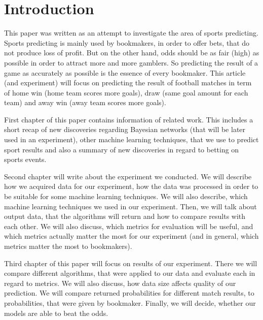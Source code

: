 \documentclass[conference]{IEEEtran}
\begin{document}




%
\IEEEpeerreviewmaketitle



\section{Introduction}

This paper was written as an attempt to investigate the area of sports predicting.
Sports predicting is mainly used by bookmakers, in order to offer bets, that do 
not produce loss of profit. But on the other hand, odds should be as fair (high) as possible
in order to attract more and more gamblers. So predicting the result of a game as accurately
as possible is the essence of every bookmaker. This article (and experiment) will focus on 
predicting the result of football matches in term of home win (home team scores more goals),
draw (same goal amount for each team) and away win (away team scores more goals).

First chapter of this paper contains information of related work. This includes a short recap
of new discoveries regarding Bayesian networks (that will be later used in an experiment), 
other machine learning techniques, that we use to predict sport results and also a summary of 
new discoveries in regard to betting on sports events.

Second chapter will write about the experiment we conducted. We will describe how we acquired 
data for our experiment, how the data was processed in order to be suitable for some machine 
learning techniques. We will also describe, which machine learning techniques we used in our experiment.
Then, we will talk about output data, that the algorithms will return and how to compare
results with each other. We will also discuss, which metrics for evaluation will be useful,
and which metrics actually matter the most for our experiment (and in general, which metrics
matter the most to bookmakers).

Third chapter of this paper will focus on results of our experiment. There we will compare 
different algorithms, that were applied to our data and evaluate each in regard to metrics.
We will also discuss, how data size affects quality of our prediction. We will compare 
returned probabilities for different match results, to probabilities, that were given by
bookmaker. Finally, we will decide, whether our models are able to beat the odds.
\end{document}

